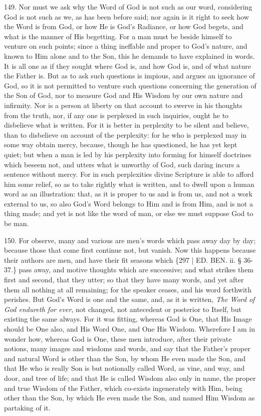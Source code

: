 149. Nor must we ask why the
Word of God is not such as our word, considering God is not such
as we, as has been before said; nor again is it right to seek how the
Word is from God, or how He is God's Radiance, or how God begets, and
what is the manner of His begetting. For a man must be beside himself
to venture on such points; since a thing ineffable and proper to God's
nature, and known to Him alone and to the Son, this he demands to have
explained in words. It is all one as if they sought where God is, and
how God is, and of what nature the Father is. But as to ask such
questions is impious, and argues an ignorance of God, so it is not
permitted to venture such questions concerning the generation of the
Son of God, nor to measure God and His Wisdom by our own nature and
infirmity. Nor is a person at liberty on that account to swerve in his
thoughts from the truth, nor, if any one is perplexed in such
inquiries, ought he to disbelieve what is written. For it is better in
perplexity to be silent and believe, than to disbelieve on account of
the perplexity: for he who is perplexed may in some way obtain mercy,
because, though he has questioned, he has yet kept quiet; but when a
man is led by his perplexity into forming for himself doctrines which
beseem not, and utters what is unworthy of God, such daring incurs a
sentence without mercy. For in such perplexities divine Scripture is
able to afford him some relief, so as to take rightly what is written,
and to dwell upon a human word as an illustration: that, as it is
proper to us and is from us, and not a work external to us, so also
God's Word belongs to Him and is from Him, and is not a thing made;
and yet is not like the word of man, or else we must suppose God to be
man.

150. For observe, many and
various are men's words which pass away day by day; because those that
come first continue not, but vanish. Now this happens because their
authors are men, and have their fit seasons which \{297 | ED. BEN.
ii. § 36-37.\} pass away, and motive thoughts which are successive; and
what strikes them first and second, that they utter; so that they have
many words, and yet after them all nothing at all remaining; for the
speaker ceases, and his word forthwith perishes. But God's Word is one
and the same, and, as it is written, \emph{The Word of God endureth for
ever}, not changed, not antecedent or posterior to Itself, but
existing the same always. For it was fitting, whereas God is One, that
His Image should be One also, and His Word One, and One His Wisdom.
Wherefore I am in wonder how, whereas God is One, these men introduce,
after their private notions, many images and wisdoms and words, and
say that the Father's proper and natural Word is other than the Son,
by whom He even made the Son, and that He who is really Son is but
notionally called Word, as vine, and way, and door, and tree of life;
and that He is called Wisdom also only in name, the proper and true
Wisdom of the Father, which co-exists ingenerately with Him, being
other than the Son, by which He even made the Son, and named Him
Wisdom as partaking of it.

